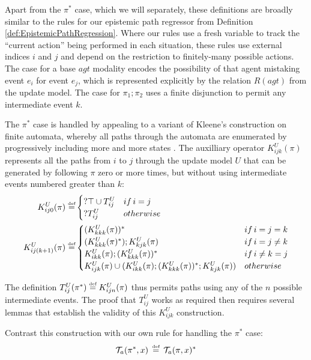 Apart from the $\pi^{*}$ case, which we will separately, these definitions
are broadly similar to the rules for our epistemic path regressor
from Definition \ref{def:EpistemicPathRegression}. Where our rules
use a fresh variable to track the {}``current action'' being performed
in each situation, these rules use external indices $i$ and $j$
and depend on the restriction to finitely-many possible actions. The
case for a base $agt$ modality encodes the possibility of that agent
mistaking event $e_{i}$ for event $e_{j}$, which is represented
explicitly by the relation $R(agt)$ from the update model. The case
for $\pi_{1};\pi_{2}$ uses a finite disjunction to permit any intermediate
event $k$.

The $\pi^{*}$ case is handled by appealing to a variant of Kleene's
construction on finite automata, whereby all paths through the automata
are enumerated by progressively including more and more states \citep[ Theorem 2.5.1]{lewis81theory_of_computation}.
The auxilliary operator $K_{ijk}^{U}(\pi)$ represents all the paths
from $i$ to $j$ through the update model $U$ that can be generated
by following $\pi$ zero or more times, but without using intermediate
events numbered greater than $k$:\begin{align*}
K_{ij0}^{U}(\pi)\stackrel{\mbox{\tiny def}}{=} & \begin{cases}
?\top\cup T_{ij}^{U} & if\, i=j\\
?T_{ij}^{U} & otherwise\end{cases}\\
K_{ij(k+1)}^{U}(\pi)\stackrel{\mbox{\tiny def}}{=} & \begin{cases}
(K_{kkk}^{U}(\pi))^{*} & if\, i=j=k\\
(K_{kkk}^{U}(\pi)^{*});K_{kjk}^{U}(\pi) & if\, i=j\neq k\\
K_{ikk}^{U}(\pi);(K_{kkk}^{U}(\pi))^{*} & if\, i\neq k=j\\
K_{ijk}^{U}(\pi)\cup(K_{ikk}^{U}(\pi);(K_{kkk}^{U}(\pi))^{*};K{}_{kjk}^{U}(\pi)) & otherwise\end{cases}\end{align*}


The definition $T_{ij}^{U}(\pi^{*})\stackrel{\mbox{\tiny def}}{=} K_{ijn}^{U}(\pi)$ thus
permits paths using any of the $n$ possible intermediate events.
The proof that $T_{ij}^{U}$ works as required then requires several
lemmas that establish the validity of this $K_{ijk}^{U}$ construction. 

Contrast this construction with our own rule for handling the $\pi^{*}$
case:\[
\mathcal{T}_{a}(\pi^{*},x)\,\stackrel{\mbox{\tiny def}}{=}\,\mathcal{T}_{a}(\pi,x)^{*}\]


